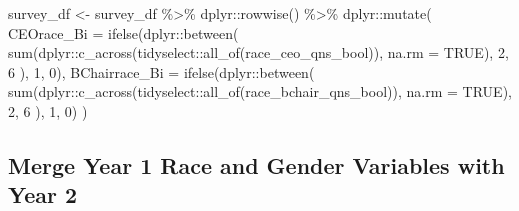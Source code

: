 \documentclass[
  letterpaper,
]{scrbook}
\newenvironment{Shaded}{\begin{snugshade}}{\end{snugshade}}
\newcommand{\AttributeTok}[1]{\textcolor[rgb]{0.40,0.45,0.13}{#1}}
\newcommand{\ConstantTok}[1]{\textcolor[rgb]{0.56,0.35,0.01}{#1}}
\newcommand{\DecValTok}[1]{\textcolor[rgb]{0.68,0.00,0.00}{#1}}
\newcommand{\FunctionTok}[1]{\textcolor[rgb]{0.28,0.35,0.67}{#1}}
\newcommand{\NormalTok}[1]{\textcolor[rgb]{0.00,0.23,0.31}{#1}}
\newcommand{\OtherTok}[1]{\textcolor[rgb]{0.00,0.23,0.31}{#1}}
\newcommand{\SpecialCharTok}[1]{\textcolor[rgb]{0.37,0.37,0.37}{#1}}
\begin{document}
\begin{Shaded}
\begin{Highlighting}[]
\NormalTok{survey\_df }\OtherTok{\textless{}{-}} 
\NormalTok{  survey\_df }\SpecialCharTok{\%\textgreater{}\%}
\NormalTok{  dplyr}\SpecialCharTok{::}\FunctionTok{rowwise}\NormalTok{() }\SpecialCharTok{\%\textgreater{}\%} 
\NormalTok{  dplyr}\SpecialCharTok{::}\FunctionTok{mutate}\NormalTok{(}
    \AttributeTok{CEOrace\_Bi =} \FunctionTok{ifelse}\NormalTok{(dplyr}\SpecialCharTok{::}\FunctionTok{between}\NormalTok{(}
      \FunctionTok{sum}\NormalTok{(dplyr}\SpecialCharTok{::}\FunctionTok{c\_across}\NormalTok{(tidyselect}\SpecialCharTok{::}\FunctionTok{all\_of}\NormalTok{(race\_ceo\_qns\_bool)), }\AttributeTok{na.rm =} \ConstantTok{TRUE}\NormalTok{), }\DecValTok{2}\NormalTok{, }\DecValTok{6}
\NormalTok{    ), }\DecValTok{1}\NormalTok{, }\DecValTok{0}\NormalTok{),}
   \AttributeTok{BChairrace\_Bi =} \FunctionTok{ifelse}\NormalTok{(dplyr}\SpecialCharTok{::}\FunctionTok{between}\NormalTok{(}
      \FunctionTok{sum}\NormalTok{(dplyr}\SpecialCharTok{::}\FunctionTok{c\_across}\NormalTok{(tidyselect}\SpecialCharTok{::}\FunctionTok{all\_of}\NormalTok{(race\_bchair\_qns\_bool)), }\AttributeTok{na.rm =} \ConstantTok{TRUE}\NormalTok{), }\DecValTok{2}\NormalTok{, }\DecValTok{6}
\NormalTok{    ), }\DecValTok{1}\NormalTok{, }\DecValTok{0}\NormalTok{)  }
\NormalTok{  )}
\end{Highlighting}
\end{Shaded}

\subsection{Merge Year 1 Race and Gender Variables with Year
2}\label{merge-year-1-race-and-gender-variables-with-year-2}
\end{document}
